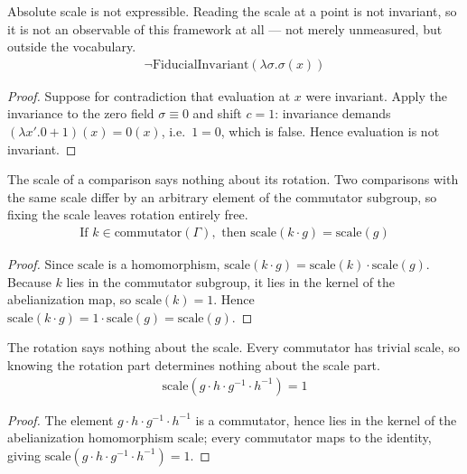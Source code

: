 \begin{theorem}
Absolute scale is not expressible.  Reading the scale at a point is not invariant, so it is not an observable of this framework at all — not merely unmeasured, but outside the vocabulary.
\begin{align*}
\neg \text{FiducialInvariant}(\lambda \sigma. \sigma(x))
\end{align*}
\begin{proof}
Suppose for contradiction that evaluation at $x$ were invariant. Apply the invariance to the zero field $\sigma\equiv0$ and shift $c=1$: invariance demands $(\lambda x'. 0+1)(x) = 0(x)$, i.e.\ $1=0$, which is false. Hence evaluation is not invariant.
\end{proof}
\end{theorem}

\begin{theorem}
The scale of a comparison says nothing about its rotation.  Two comparisons with the same scale differ by an arbitrary element of the commutator subgroup, so fixing the scale leaves rotation entirely free.
\begin{align*}
\text{If } k \in \text{commutator}(\Gamma), \text{ then } \text{scale}(k \cdot g) = \text{scale}(g)
\end{align*}
\begin{proof}
Since $\text{scale}$ is a homomorphism, $\text{scale}(k\cdot g) = \text{scale}(k)\cdot\text{scale}(g)$. Because $k$ lies in the commutator subgroup, it lies in the kernel of the abelianization map, so $\text{scale}(k)=1$. Hence $\text{scale}(k\cdot g) = 1\cdot\text{scale}(g) = \text{scale}(g)$.
\end{proof}
\end{theorem}

\begin{theorem}
The rotation says nothing about the scale.  Every commutator has trivial scale, so knowing the rotation part determines nothing about the scale part.
\begin{align*}
\text{scale}(g \cdot h \cdot g^{-1} \cdot h^{-1}) = 1
\end{align*}
\begin{proof}
The element $g\cdot h\cdot g^{-1}\cdot h^{-1}$ is a commutator, hence lies in the kernel of the abelianization homomorphism $\text{scale}$; every commutator maps to the identity, giving $\text{scale}(g\cdot h\cdot g^{-1}\cdot h^{-1})=1$.
\end{proof}
\end{theorem}

